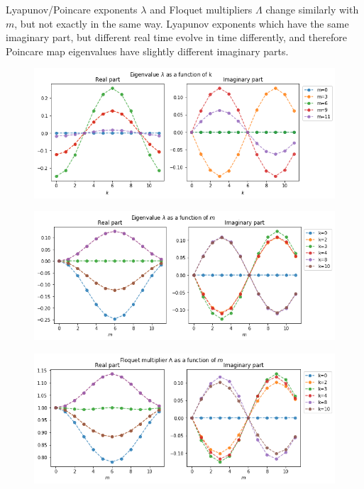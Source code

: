 \documentclass[a4paper,12pt]{article}
\begin{document}
Lyapunov/Poincare exponents $\lambda$ and Floquet multipliers $\Lambda$ change similarly with $m$, but not exactly in the same way. Lyapunov exponents which have the same imaginary part, but different real time evolve in time differently, and therefore Poincare map eigenvalues have slightly different imaginary parts.

\begin{figure}[h]
    \centering
    \includegraphics[width=.95\textwidth]{assets/theory-2019-09-06-173919422-458.png}
\end{figure}


\begin{figure}[h]
    \centering
    \includegraphics[width=.95\textwidth]{assets/theory-2019-08-27-181719526-a8d.png}
\end{figure}

\begin{figure}[h]
    \centering
    \includegraphics[width=.95\textwidth]{assets/theory-2019-08-27-181703429-803.png}
\end{figure}
\end{document}
